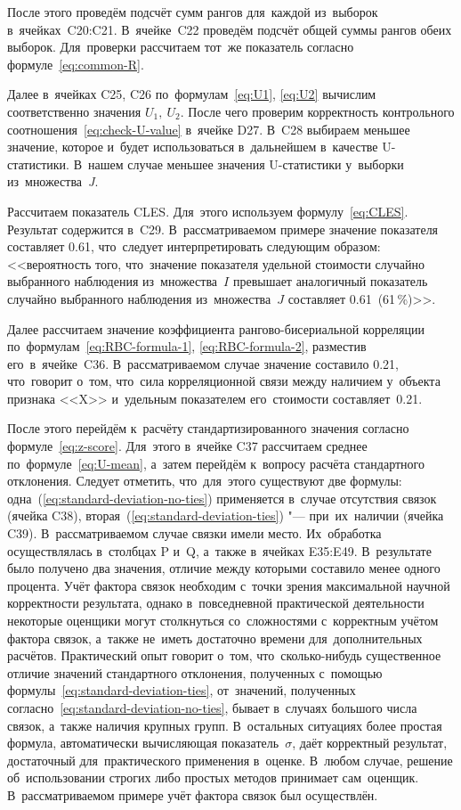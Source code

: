 \documentclass[]{scrreprt}
\begin{document}
После этого проведём подсчёт сумм рангов для~каждой из~выборок в~ячейках~C20:C21. В~ячейке~C22 проведём подсчёт общей суммы рангов обеих выборок. Для~проверки рассчитаем тот~же показатель согласно формуле~\ref{eq:common-R}.

Далее в~ячейках C25, C26 по~формулам~\ref{eq:U1}, \ref{eq:U2} вычислим соответственно значения ${\textstyle U_1,\ U_{2}}$. После чего проверим корректность контрольного соотношения~\ref{eq:check-U-value} в~ячейке D27. В~C28 выбираем меньшее значение, которое и~будет использоваться в~дальнейшем в~качестве U-статистики. В~нашем случае меньшее значения U-статистики у~выборки из~множества~\textit{J}.

Рассчитаем показатель CLES. Для~этого используем формулу~\ref{eq:CLES}. Результат содержится в~C29. В~рассматриваемом примере значение показателя составляет 0.61, что~следует интерпретировать следующим образом: <<вероятность того, что~значение показателя удельной стоимости случайно выбранного наблюдения из~множества~$I$ превышает аналогичный показатель случайно выбранного наблюдения из~множества~$J$ составляет 0.61~(61\,\%)>>.

Далее рассчитаем значение коэффициента рангово-бисериальной корреляции по~формулам~\ref{eq:RBC-formula-1}, \ref{eq:RBC-formula-2}, разместив его~в~ячейке~C36. В~рассматриваемом случае значение составило 0.21, что~говорит о~том, что~сила корреляционной связи между наличием у~объекта признака <<X>> и~удельным показателем его~стоимости составляет~0.21.

После этого перейдём к~расчёту стандартизированного значения согласно формуле~\ref{eq:z-score}. Для~этого в~ячейке C37 рассчитаем среднее по~формуле~\ref{eq:U-mean}, а~затем перейдём к~вопросу расчёта стандартного отклонения. Следует отметить, что~для~этого существуют две формулы: одна~(\ref{eq:standard-deviation-no-ties}) применяется в~случае отсутствия связок (ячейка C38), вторая~(\ref{eq:standard-deviation-ties}) "--- при~их~наличии (ячейка C39). В~рассматриваемом случае связки имели место. Их~обработка осуществлялась в~столбцах P и~Q, а~также в~ячейках E35:E49. В~результате было получено два значения, отличие между которыми составило менее одного процента. Учёт фактора связок необходим с~точки зрения максимальной научной корректности результата, однако в~повседневной практической деятельности некоторые оценщики могут столкнуться со~сложностями с~корректным учётом фактора связок, а~также не~иметь достаточно времени для~дополнительных расчётов. Практический опыт говорит о~том, что~сколько-нибудь существенное отличие значений стандартного отклонения, полученных с~помощью формулы~\ref{eq:standard-deviation-ties}, от~значений, полученных согласно~\ref{eq:standard-deviation-no-ties}, бывает в~случаях большого числа связок, а~также наличия крупных групп. В~остальных ситуациях более простая формула, автоматически вычисляющая показатель~${\textstyle \sigma}$, даёт корректный результат, достаточный для~практического применения в~оценке. В~любом случае, решение об~использовании строгих либо простых методов принимает сам~оценщик. В~рассматриваемом примере учёт фактора связок был осуществлён. 
\end{document}

